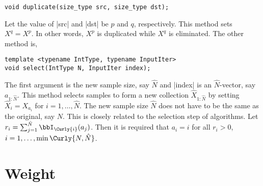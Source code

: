 \begin{verbatim}
void duplicate(size_type src, size_type dst);
\end{verbatim}
Let the value of |src| and |dst| be $p$ and $q$, respectively. This method sets
$X^q = X^p$. In other words, $X^p$ is duplicated while $X^q$ is eliminated. The
other method is,
\begin{verbatim}
template <typename IntType, typename InputIter>
void select(IntType N, InputIter index);
\end{verbatim}
The first argument is the new sample size, say $\hat{N}$ and |index| is an
$\hat{N}$-vector, say $a_{1:\hat{N}}$. This method selects samples to form a
new collection $\hat{X}_{1:\hat{N}}$  by setting $\hat{X}_i = X_{a_i}$ for $i =
1,\dots,\hat{N}$. The new sample size $\hat{N}$ does not have to be the same as
the original, say $N$. This is closely related to the selection step of \smc
algorithms. Let $r_i = \sum_{j = 1}^{\hat{N}}\bbI_{\Curly{i}}(a_j)$. Then it is
required that $a_i = i$ for all $r_i > 0$, $i = 1,\dots,\min\Curly{N,
  \hat{N}}$.

\section{Weight}
\label{sec:Weight}

